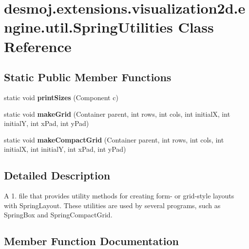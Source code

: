 \section{desmoj.\-extensions.\-visualization2d.\-engine.\-util.\-Spring\-Utilities Class Reference}
\label{classdesmoj_1_1extensions_1_1visualization2d_1_1engine_1_1util_1_1_spring_utilities}
\subsection*{Static Public Member Functions}
\begin{DoxyCompactItemize}
\item 
static void {\bf print\-Sizes} (Component c)
\item 
static void {\bf make\-Grid} (Container parent, int rows, int cols, int initial\-X, int initial\-Y, int x\-Pad, int y\-Pad)
\item 
static void {\bf make\-Compact\-Grid} (Container parent, int rows, int cols, int initial\-X, int initial\-Y, int x\-Pad, int y\-Pad)
\end{DoxyCompactItemize}


\subsection{Detailed Description}
A 1. file that provides utility methods for creating form-\/ or grid-\/style layouts with Spring\-Layout. These utilities are used by several programs, such as Spring\-Box and Spring\-Compact\-Grid. 

\subsection{Member Function Documentation}
